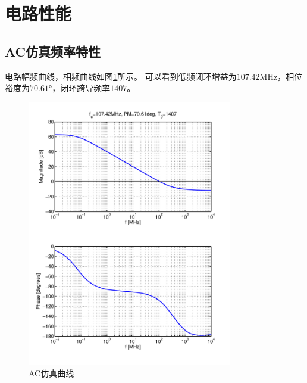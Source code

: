 \documentclass[a4paper]{article}
\newcommand{\uMHz}{\si{\mega\hertz}}
\newcommand{\udeg}{\si{\degree}}
\begin{document}
\newpage

\section{电路性能}
\subsection{AC仿真频率特性}
电路幅频曲线，相频曲线如图\ref{commonac}所示。
可以看到低频闭环增益为$107.42\uMHz$，相位裕度为$70.61\udeg$，闭环跨导频率$1407$。
\begin{figure}[htb]
    \begin{center}
        \includegraphics[width=0.8\textwidth]{common/ac.pdf}
    \end{center}
    \caption{AC仿真曲线}
    \label{commonac}
\end{figure}

\newpage
\clearpage
\end{document}
